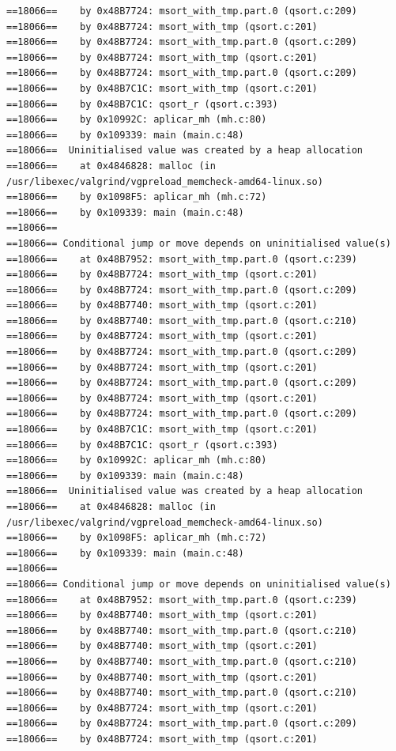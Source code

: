 \documentclass[12pt]{article}
\begin{document}
\begin{lstlisting}[style=EstiloValgrind]
==18066==    by 0x48B7724: msort_with_tmp.part.0 (qsort.c:209)
==18066==    by 0x48B7724: msort_with_tmp (qsort.c:201)
==18066==    by 0x48B7724: msort_with_tmp.part.0 (qsort.c:209)
==18066==    by 0x48B7724: msort_with_tmp (qsort.c:201)
==18066==    by 0x48B7724: msort_with_tmp.part.0 (qsort.c:209)
==18066==    by 0x48B7C1C: msort_with_tmp (qsort.c:201)
==18066==    by 0x48B7C1C: qsort_r (qsort.c:393)
==18066==    by 0x10992C: aplicar_mh (mh.c:80)
==18066==    by 0x109339: main (main.c:48)
==18066==  Uninitialised value was created by a heap allocation
==18066==    at 0x4846828: malloc (in /usr/libexec/valgrind/vgpreload_memcheck-amd64-linux.so)
==18066==    by 0x1098F5: aplicar_mh (mh.c:72)
==18066==    by 0x109339: main (main.c:48)
==18066== 
==18066== Conditional jump or move depends on uninitialised value(s)
==18066==    at 0x48B7952: msort_with_tmp.part.0 (qsort.c:239)
==18066==    by 0x48B7724: msort_with_tmp (qsort.c:201)
==18066==    by 0x48B7724: msort_with_tmp.part.0 (qsort.c:209)
==18066==    by 0x48B7740: msort_with_tmp (qsort.c:201)
==18066==    by 0x48B7740: msort_with_tmp.part.0 (qsort.c:210)
==18066==    by 0x48B7724: msort_with_tmp (qsort.c:201)
==18066==    by 0x48B7724: msort_with_tmp.part.0 (qsort.c:209)
==18066==    by 0x48B7724: msort_with_tmp (qsort.c:201)
==18066==    by 0x48B7724: msort_with_tmp.part.0 (qsort.c:209)
==18066==    by 0x48B7724: msort_with_tmp (qsort.c:201)
==18066==    by 0x48B7724: msort_with_tmp.part.0 (qsort.c:209)
==18066==    by 0x48B7C1C: msort_with_tmp (qsort.c:201)
==18066==    by 0x48B7C1C: qsort_r (qsort.c:393)
==18066==    by 0x10992C: aplicar_mh (mh.c:80)
==18066==    by 0x109339: main (main.c:48)
==18066==  Uninitialised value was created by a heap allocation
==18066==    at 0x4846828: malloc (in /usr/libexec/valgrind/vgpreload_memcheck-amd64-linux.so)
==18066==    by 0x1098F5: aplicar_mh (mh.c:72)
==18066==    by 0x109339: main (main.c:48)
==18066== 
==18066== Conditional jump or move depends on uninitialised value(s)
==18066==    at 0x48B7952: msort_with_tmp.part.0 (qsort.c:239)
==18066==    by 0x48B7740: msort_with_tmp (qsort.c:201)
==18066==    by 0x48B7740: msort_with_tmp.part.0 (qsort.c:210)
==18066==    by 0x48B7740: msort_with_tmp (qsort.c:201)
==18066==    by 0x48B7740: msort_with_tmp.part.0 (qsort.c:210)
==18066==    by 0x48B7740: msort_with_tmp (qsort.c:201)
==18066==    by 0x48B7740: msort_with_tmp.part.0 (qsort.c:210)
==18066==    by 0x48B7724: msort_with_tmp (qsort.c:201)
==18066==    by 0x48B7724: msort_with_tmp.part.0 (qsort.c:209)
==18066==    by 0x48B7724: msort_with_tmp (qsort.c:201)

\end{lstlisting}
\end{document}
